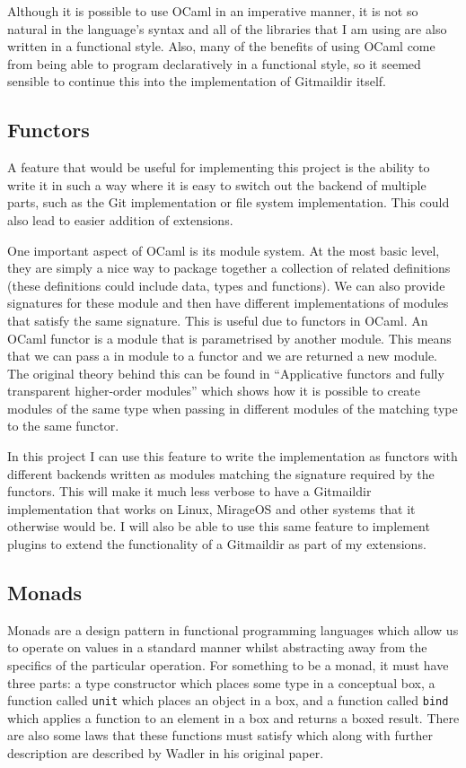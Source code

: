 Although it is possible to use OCaml in an imperative manner, it is not so natural in the language's syntax and all of the libraries that I am using are also written in a functional style. Also, many of the benefits of using OCaml come from being able to program declaratively in a functional style, so it seemed sensible to continue this into the implementation of Gitmaildir itself.

\subsection{Functors}

A feature that would be useful for implementing this project is the ability to write it in such a way where it is easy to switch out the backend of multiple parts, such as the Git implementation or file system implementation. This could also lead to easier addition of extensions.

One important aspect of OCaml is its module system. At the most basic level, they are simply a nice way to package together a collection of related definitions (these definitions could include data, types and functions). We can also provide signatures for these module and then have different implementations of modules that satisfy the same signature. This is useful due to functors in OCaml. An OCaml functor is a module that is parametrised by another module. This means that we can pass a in module to a functor and we are returned a new module. The original theory behind this can be found in ``Applicative functors and fully transparent higher-order modules''\cite{leroy1995functors} which shows how it is possible to create modules of the same type when passing in different modules of the matching type to the same functor.

In this project I can use this feature to write the implementation as functors with different backends written as modules matching the signature required by the functors. This will make it much less verbose to have a Gitmaildir implementation that works on Linux, MirageOS and other systems that it otherwise would be. I will also be able to use this same feature to implement plugins to extend the functionality of a Gitmaildir as part of my extensions.

\subsection{Monads}

Monads are a design pattern in functional programming languages which allow us to operate on values in a standard manner whilst abstracting away from the specifics of the particular operation. For something to be a monad, it must have three parts: a type constructor which places some type in a conceptual box, a function called \texttt{unit} which places an object in a box, and a function called \texttt{bind} which applies a function to an element in a box and returns a boxed result. There are also some laws that these functions must satisfy which along with further description are described by Wadler in his original paper\cite{wadler90monads}.

